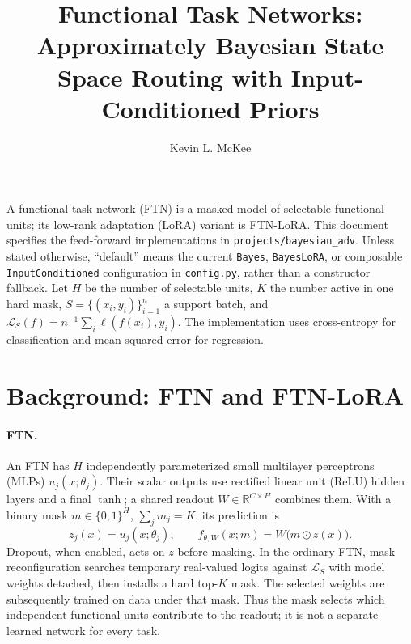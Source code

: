 \documentclass[11pt]{article}
\title{Functional Task Networks: Approximately Bayesian State Space Routing with Input-Conditioned Priors}
\author{Kevin L. McKee}
\date{}
\newcommand{\loss}{\mathcal{L}}
\begin{document}
\maketitle

\noindent A functional task network (FTN) is a masked model of selectable
functional units; its low-rank adaptation (LoRA) variant is FTN-LoRA.
This document specifies the feed-forward implementations in
\texttt{projects/bayesian\_adv}. Unless stated otherwise, ``default'' means the
current \texttt{Bayes}, \texttt{BayesLoRA}, or composable
\texttt{InputConditioned} configuration in \texttt{config.py}, rather than a
constructor fallback. Let $H$ be the number of selectable units, $K$ the
number active in one hard mask, $S=\{(x_i,y_i)\}_{i=1}^n$ a support batch, and
$\loss_S(f)=n^{-1}\sum_i\ell(f(x_i),y_i)$. The implementation uses cross-entropy
for classification and mean squared error for regression.

\section{Background: FTN and FTN-LoRA}
\paragraph{FTN.}
An FTN has $H$ independently parameterized small multilayer perceptrons
(MLPs) $u_j(x;\theta_j)$. Their scalar outputs use rectified linear unit
(ReLU) hidden layers and a final $\tanh$; a shared
readout $W\in\mathbb{R}^{C\times H}$ combines them. With a binary mask
$m\in\{0,1\}^H$, $\sum_jm_j=K$, its prediction is
\begin{equation}
 z_j(x)=u_j(x;\theta_j),\qquad
 f_{\theta,W}(x;m)=W\bigl(m\odot z(x)\bigr).
 \label{eq:ftn}
\end{equation}
Dropout, when enabled, acts on $z$ before masking. In the ordinary FTN,
mask reconfiguration searches temporary real-valued logits against $\loss_S$
with model weights detached, then installs a hard top-$K$ mask. The selected
weights are subsequently trained on data under that mask. Thus the mask
selects which independent functional units contribute to the readout; it is
not a separate learned network for every task.
\end{document}
